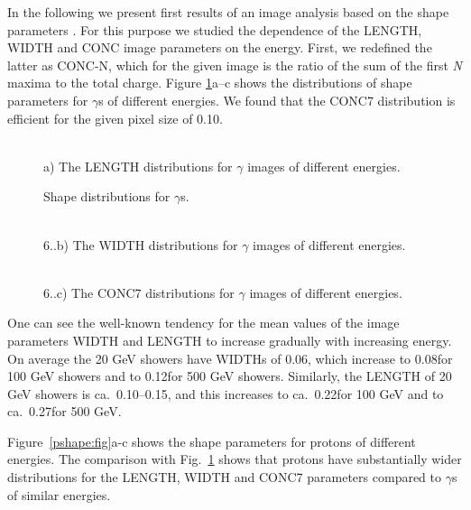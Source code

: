 In the following we present first results of an image analysis based on the
shape 
parameters . For this purpose we studied the dependence of
the LENGTH, WIDTH and CONC image parameters on the energy.  First, we
redefined the latter as CONC-N, which for the given image is
the ratio of the sum of the first {\sl N} maxima to the total
charge. Figure \ref{gshape:fig}a--c  shows the distributions
of shape parameters for $\gamma$s of different energies. We found that
the
CONC7 distribution
is efficient for the given pixel size of 0.10\tdeg.
\setcounter{figdummy}{\value{figure}}
\begin{figure}
 \begin{center}
  \\
  {a) The LENGTH distributions for $\gamma$ images of 
   different energies.}
  \caption{Shape distributions for $\gamma$s.}
  \label{gshape:fig}
 \end{center}
\end{figure}
\begin{figure}
 \begin{center}
  \\
 {6.{\thefigdummy}.b) The WIDTH distributions for $\gamma$ images of 
   different energies.}
 \end{center}
\end{figure}
\begin{figure}
 \begin{center}
  \\
  {6.{\thefigdummy}.c) The CONC7 distributions for $\gamma$ images of 
   different energies.}
 \end{center}
\end{figure}

One can see the well-known tendency for the mean
values of the image parameters
WIDTH and LENGTH to increase gradually with increasing energy. 
On average the 20 GeV showers have WIDTHs of 0.06\tdeg, which increase to
0.08\tdeg for 100 GeV showers and to 0.12\tdeg for 500 GeV
showers.  Similarly, the LENGTH of 20 GeV showers is
ca.~0.10--0.15\tdeg, and this increases to ca.~0.22\tdeg for 100
GeV and to ca.~0.27\tdeg for 500 GeV.

Figure~\ref{pshape:fig}a-c shows the shape parameters for
protons of different energies. The comparison with Fig.~\ref{gshape:fig}
shows that
protons have substantially wider distributions for
the LENGTH, WIDTH and CONC7 parameters compared to $\gamma$s of similar
energies.

